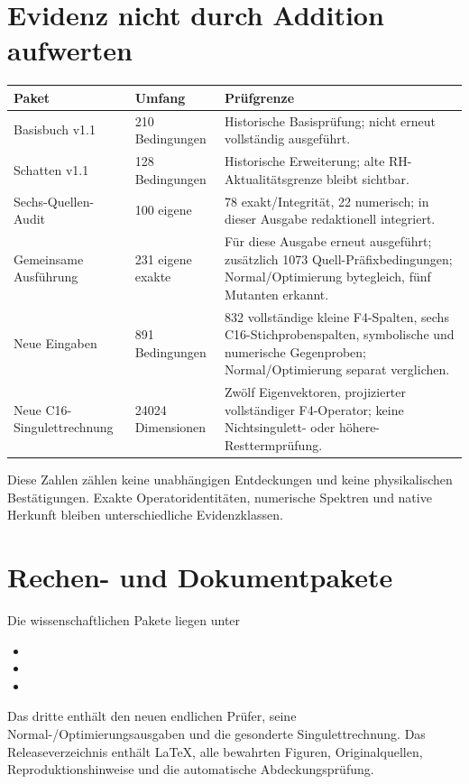 \section{Evidenz nicht durch Addition aufwerten}
\begin{longtable}{L{37mm}L{30mm}L{83mm}}
\toprule Paket&Umfang&Prüfgrenze\\\midrule\endhead
Basisbuch v1.1&210 Bedingungen&Historische Basisprüfung; nicht erneut vollständig ausgeführt.\\
Schatten v1.1&128 Bedingungen&Historische Erweiterung; alte RH-Aktualitätsgrenze bleibt sichtbar.\\
Sechs-Quellen-Audit&100 eigene&78 exakt/Integrität, 22 numerisch; in dieser Ausgabe redaktionell integriert.\\
Gemeinsame Ausführung&231 eigene exakte&Für diese Ausgabe erneut ausgeführt; zusätzlich 1073 Quell-Präfixbedingungen; Normal/Optimierung bytegleich, fünf Mutanten erkannt.\\
Neue Eingaben&891 Bedingungen&832 vollständige kleine F4-Spalten, sechs C16-Stichprobenspalten, symbolische und numerische Gegenproben; Normal/Optimierung separat verglichen.\\
Neue C16-Singulettrechnung&24024 Dimensionen&Zwölf Eigenvektoren, projizierter vollständiger F4-Operator; keine Nichtsingulett- oder höhere-Resttermprüfung.\\\bottomrule
\end{longtable}
Diese Zahlen zählen keine unabhängigen Entdeckungen und keine physikalischen Bestätigungen. Exakte Operatoridentitäten, numerische Spektren und native Herkunft bleiben unterschiedliche Evidenzklassen.

\section{Rechen- und Dokumentpakete}
Die wissenschaftlichen Pakete liegen unter
\begin{itemize}
\item {}
\item {}
\item {}
\end{itemize}
Das dritte enthält den neuen endlichen Prüfer, seine Normal-/Optimierungsausgaben und die gesonderte Singulettrechnung. Das Releaseverzeichnis enthält LaTeX, alle bewahrten Figuren, Originalquellen, Reproduktionshinweise und die automatische Abdeckungsprüfung.

